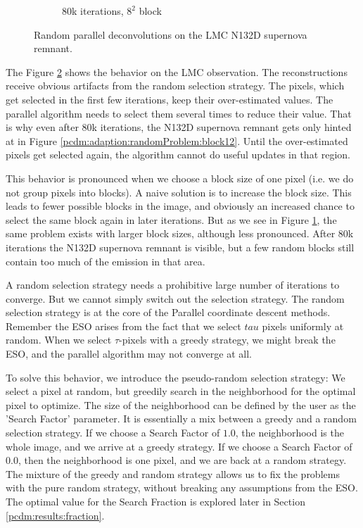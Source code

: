 \begin{figure}[h]
\begin{subfigure}[b]{0.2405\linewidth}
		\caption{80k iterations, $8^2$ block}
		\label{pcdm:adaption:randomProblem:block82}
	\end{subfigure}
	\caption{Random parallel deconvolutions on the LMC N132D supernova remnant.}
	\label{pcdm:adaption:randomProblem}
\end{figure}

The Figure \ref{pcdm:adaption:randomProblem} shows the behavior on the LMC observation. The reconstructions receive obvious artifacts from the random selection strategy. The pixels, which get selected in the first few iterations, keep their over-estimated values. The parallel algorithm needs to select them several times to reduce their value. That is why even after 80k iterations, the N132D supernova remnant gets only hinted at in Figure \ref{pcdm:adaption:randomProblem:block12}. Until the over-estimated pixels get selected again, the algorithm cannot do useful updates in that region.

This behavior is pronounced when we choose a block size of one pixel (i.e. we do not group pixels into blocks). A naive solution is to increase the block size. This leads to fewer possible blocks in the image, and obviously an increased chance to select the same block again in later iterations. But as we see in Figure \ref{pcdm:adaption:randomProblem:block82}, the same problem exists with larger block sizes, although less pronounced. After 80k iterations the N132D supernova remnant is visible, but a few random blocks still contain too much of the emission in that area.

A random selection strategy needs a prohibitive large number of iterations to converge. But we cannot simply switch out the selection strategy. The random selection strategy is at the core of the Parallel coordinate descent methods. Remember the ESO arises from the fact that we select $tau$ pixels uniformly at random. When we select $\tau$-pixels with a greedy strategy, we might break the ESO, and the parallel algorithm may not converge at all.

To solve this behavior, we introduce the pseudo-random selection strategy:  We select a pixel at random, but greedily search in the neighborhood for the optimal pixel to optimize. The size of the neighborhood can be defined by the user as the 'Search Factor' parameter. It is essentially a mix between a greedy and a random selection strategy. If we choose a Search Factor of $1.0$, the neighborhood is the whole image, and we arrive at a greedy strategy. If we choose a Search Factor of $0.0$, then the neighborhood is one pixel, and we are back at a random strategy. The mixture of the greedy and random strategy allows us to fix the problems with the pure random strategy, without breaking any assumptions from the ESO. The optimal value for the Search Fraction is explored later in Section \ref{pcdm:results:fraction}.

